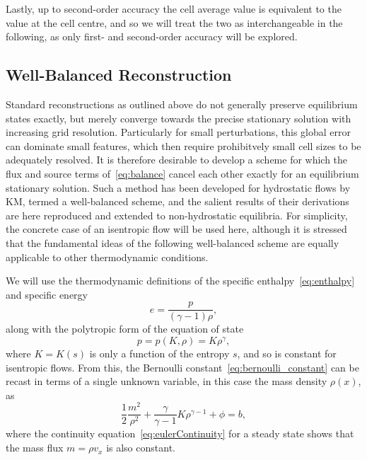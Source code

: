 Lastly, up to second-order accuracy the cell average value is equivalent to the value at the cell centre, and so we will treat the two as interchangeable in the following, as only first- and second-order accuracy will be explored. 

\subsection{Well-Balanced Reconstruction}
\label{subsec:wellBalanced}

Standard reconstructions as outlined above do not generally preserve equilibrium states exactly, but merely converge towards the precise stationary solution with increasing grid resolution. Particularly for small perturbations, this global error can dominate small features, which then require prohibitvely small cell sizes to be adequately resolved. It is therefore desirable to develop a scheme for which the flux and source terms of~\eqref{eq:balance} cancel each other exactly for an equilibrium stationary solution. Such a method has been developed for hydrostatic flows by KM, termed a well-balanced scheme, and the salient results of their derivations are here reproduced and extended to non-hydrostatic equilibria. For simplicity, the concrete case of an isentropic flow will be used here, although it is stressed that the fundamental ideas of the following well-balanced scheme are equally applicable to other thermodynamic conditions.

We will use the thermodynamic definitions of the specific enthalpy~\eqref{eq:enthalpy} and specific energy
\begin{equation}
e=\frac{p}{(\gamma-1)\rho},
\end{equation}
along with the polytropic form of the equation of state
\begin{equation} \label{eq:polyEOS}
p=p(K,\rho)=K\rho^{\gamma},
\end{equation}
where $K=K(s)$ is only a function of the entropy $s$, and so is constant for isentropic flows. From this, the Bernoulli constant~\eqref{eq:bernoulli_constant} can be recast in terms of a single unknown variable, in this case the mass density $\rho(x)$, as
\begin{equation} \label{eq:bernoulli}
\frac{1}{2}\frac{m^2}{\rho^2}+\frac{\gamma}{\gamma-1}K\rho^{\gamma-1}+\phi=b,
\end{equation}
where the continuity equation~\eqref{eq:eulerContinuity} for a steady state shows that the mass flux $m=\rho v_x$ is also constant.

